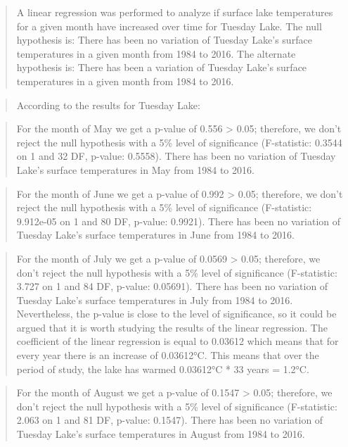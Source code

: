 \documentclass[]{article}
\begin{document}
\begin{quote}
A linear regression was performed to analyze if surface lake
temperatures for a given month have increased over time for Tuesday
Lake. The null hypothesis is: There has been no variation of Tuesday
Lake's surface temperatures in a given month from 1984 to 2016. The
alternate hypothesis is: There has been a variation of Tuesday Lake's
surface temperatures in a given month from 1984 to 2016.
\end{quote}

\begin{quote}
According to the results for Tuesday Lake:
\end{quote}

\begin{quote}
For the month of May we get a p-value of 0.556 \textgreater{} 0.05;
therefore, we don't reject the null hypothesis with a 5\% level of
significance (F-statistic: 0.3544 on 1 and 32 DF, p-value: 0.5558).
There has been no variation of Tuesday Lake's surface temperatures in
May from 1984 to 2016.
\end{quote}

\begin{quote}
For the month of June we get a p-value of 0.992 \textgreater{} 0.05;
therefore, we don't reject the null hypothesis with a 5\% level of
significance (F-statistic: 9.912e-05 on 1 and 80 DF, p-value: 0.9921).
There has been no variation of Tuesday Lake's surface temperatures in
June from 1984 to 2016.
\end{quote}

\begin{quote}
For the month of July we get a p-value of 0.0569 \textgreater{} 0.05;
therefore, we don't reject the null hypothesis with a 5\% level of
significance (F-statistic: 3.727 on 1 and 84 DF, p-value: 0.05691).
There has been no variation of Tuesday Lake's surface temperatures in
July from 1984 to 2016. Nevertheless, the p-value is close to the level
of significance, so it could be argued that it is worth studying the
results of the linear regression. The coefficient of the linear
regression is equal to 0.03612 which means that for every year there is
an increase of 0.03612°C. This means that over the period of study, the
lake has warmed 0.03612°C * 33 years = 1.2°C.
\end{quote}

\begin{quote}
For the month of August we get a p-value of 0.1547 \textgreater{} 0.05;
therefore, we don't reject the null hypothesis with a 5\% level of
significance (F-statistic: 2.063 on 1 and 81 DF, p-value: 0.1547). There
has been no variation of Tuesday Lake's surface temperatures in August
from 1984 to 2016.
\end{quote}
\end{document}
